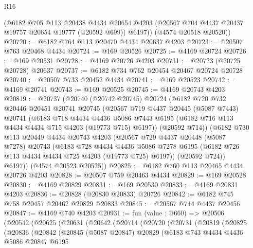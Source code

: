 \begin{lexlean}{R16}
\begin{coremodule}
        (@6182
          @705
          @113
          @20438
          @4434
          @20654
          @4203
          (@20567 @704 @4437 @20437 @19757 @20654 @19777 (@20592 @699))
          @6197))
      (@4574 @20518 @20520))
@20720 := @6182 @764 @113 @20470 @4434 @20637 @4203
@20723 := @20507 @763 @20468 @4434
@20724 := @169 @20526
@20725 := @4169 @20724
@20726 := @169 @20531
@20728 := @4169 @20726 @4203
@20731 := @20723 (@20725 @20728) @20637
@20737 := @6182 @734 @762 @20454 @20467 @20724 @20728
@20740 := @20507 @733 @20452 @4434
@20741 := @169 @20523
@20742 := @4169 @20741
@20743 := @169 @20525
@20745 := @4169 @20743 @4203
@20819 := @20737
    (@20740
      (@20742 @20745)
      @20724
      (@6182
        @720
        @732
        @20446
        @20451
        @20741
        @20745
        (@20567
          @719
          @4437
          @20445
          (@5087 @7443)
          @20741
          (@6183
            @718
            @4434
            @4436
            @5086
            @7443
            @6195
            (@6182 @716 @113 @4434 @4434 @715 @4203 (@19773 @715) @6197))
          (@20592 @714))
        (@6182
          @730
          @113
          @20449
          @4434
          @20743
          @4203
          (@20567
            @729
            @4437
            @20448
            (@5087 @7278)
            @20743
            (@6183
              @728
              @4434
              @4436
              @5086
              @7278
              @6195
              (@6182 @726 @113 @4434 @4434 @725 @4203 (@19773 @725) @6197))
            (@20592 @724))
          @6197))
      (@4574 @20523 @20525))
@20825 := @6182 @760 @113 @20465 @4434 @20726 @4203
@20828 := @20507 @759 @20463 @4434
@20829 := @169 @20528
@20830 := @4169 @20829
@20831 := @169 @20530
@20833 := @4169 @20831 @4203
@20836 := @20828 (@20830 @20833) @20726
@20842 := @6182 @745 @758 @20457 @20462 @20829 @20833
@20845 := @20567 @744 @4437 @20456
@20847 := @4169 @740 @4203
@20931 := fun (value : @660) =>
  @20506
    (@20542
      (@20625
        (@20631
          (@20642
            (@20714
              (@20720
                (@20731
                  (@20819
                    (@20825
                      (@20836
                        (@20842
                          (@20845
                            (@5087 @20847)
                            @20829
                            (@6183
                              @743
                              @4434
                              @4436
                              @5086
                              @20847
                              @6195

\end{coremodule}
\end{lexlean}

